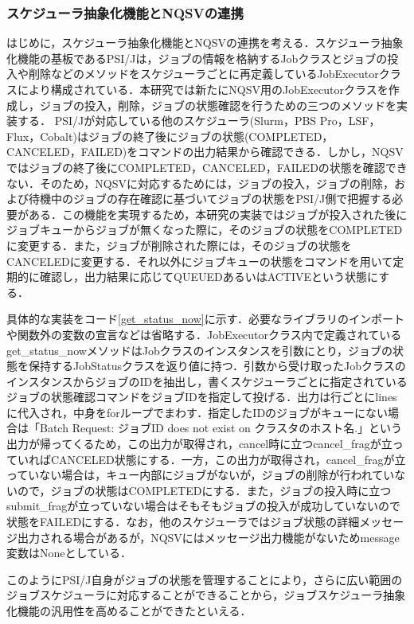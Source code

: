 \subsubsection{スケジューラ抽象化機能とNQSVの連携}
はじめに，スケジューラ抽象化機能とNQSVの連携を考える．スケジューラ抽象化機能の基板であるPSI/Jは，ジョブの情報を格納するJobクラスとジョブの投入や削除などのメソッドをスケジューラごとに再定義しているJobExecutorクラスにより構成されている．本研究では新たにNQSV用のJobExecutorクラスを作成し，ジョブの投入，削除，ジョブの状態確認を行うための三つのメソッドを実装する．
PSI/Jが対応している他のスケジューラ(Slurm，PBS Pro，LSF，Flux，Cobalt)はジョブの終了後にジョブの状態(COMPLETED，CANCELED，FAILED)をコマンドの出力結果から確認できる．しかし，NQSVではジョブの終了後にCOMPLETED，CANCELED，FAILEDの状態を確認できない．そのため，NQSVに対応するためには，ジョブの投入，ジョブの削除，および待機中のジョブの存在確認に基づいてジョブの状態をPSI/J側で把握する必要がある．この機能を実現するため，本研究の実装ではジョブが投入された後にジョブキューからジョブが無くなった際に，そのジョブの状態をCOMPLETEDに変更する．また，ジョブが削除された際には，そのジョブの状態をCANCELEDに変更する．それ以外にジョブキューの状態をコマンドを用いて定期的に確認し，出力結果に応じてQUEUEDあるいはACTIVEという状態にする．\par
具体的な実装をコード\ref{get_status_now}に示す．必要なライブラリのインポートや関数外の変数の宣言などは省略する．JobExecutorクラス内で定義されているget\_status\_nowメソッドはJobクラスのインスタンスを引数にとり，ジョブの状態を保持するJobStatusクラスを返り値に持つ．引数から受け取ったJobクラスのインスタンスからジョブのIDを抽出し，書くスケジューラごとに指定されているジョブの状態確認コマンドをジョブIDを指定して投げる．出力は行ごとにlinesに代入され，中身をforループでまわす．指定したIDのジョブがキューにない場合は「Batch Request: ジョブID does not exist on クラスタのホスト名.」という出力が帰ってくるため，この出力が取得され，cancel時に立つcancel\_fragが立っていればCANCELED状態にする．一方，この出力が取得され，cancel\_fragが立っていない場合は，キュー内部にジョブがないが，ジョブの削除が行われていないので，ジョブの状態はCOMPLETEDにする．また，ジョブの投入時に立つsubmit\_fragが立っていない場合はそもそもジョブの投入が成功していないので状態をFAILEDにする．なお，他のスケジューラではジョブ状態の詳細メッセージ出力される場合があるが，NQSVにはメッセージ出力機能がないためmessage変数はNoneとしている．\par
このようにPSI/J自身がジョブの状態を管理することにより，さらに広い範囲のジョブスケジューラに対応することができることから，ジョブスケジューラ抽象化機能の汎用性を高めることができたといえる．\par

